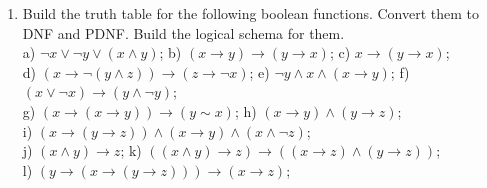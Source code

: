 \documentclass[a4paper,12pt]{article}
\begin{document}
\begin{large}
\begin{enumerate}
\item Build the truth table for the following boolean functions. Convert them to DNF and PDNF. Build the logical schema for them. \\
a) $\neg x \vee \neg y \vee (x\wedge y) $; b) $(x\rightarrow y)\rightarrow (y\rightarrow x)$; c) $x\rightarrow (y\rightarrow x)$; \\
d) $(x\rightarrow \neg(y\wedge z)) \rightarrow(z \rightarrow \neg x) $; e) $\neg y \wedge x \wedge (x\rightarrow y)$;
f) $(x\vee \neg x) \rightarrow (y\wedge \neg y)$; \\
g) $(x\rightarrow (x\rightarrow y))\rightarrow (y\sim x) $; h) $(x\rightarrow y)\wedge (y\rightarrow z) $; \\
i) $(x \rightarrow(y \rightarrow z))\wedge (x\rightarrow y)\wedge (x\wedge \neg z) $; \\
j) $(x\wedge y)\rightarrow z $; k) $((x\wedge y)\rightarrow z)\rightarrow((x\rightarrow z) \wedge(y\rightarrow z)) $; \\
l) $ (y\rightarrow (x\rightarrow (y\rightarrow z)))\rightarrow (x\rightarrow z)$;

\end{enumerate}



\end{large}
\end{document}
